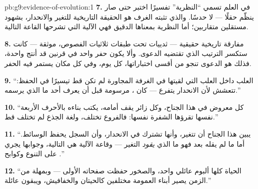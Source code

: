 \begin{solution}{pb:g9:evidence-of-evolution:1}
\textbf{7.} في العلم تسمي ``النظرية'' تفسيرًا اختبر حتى
صار ينظّم حقلًا --- لا حدسًا. والذي تثبته الغرف هو
الحقيقة التاريخية للتغير والانحدار، بشهود مستقلين
متقاربين؛ أما النظرية بمعناها الدقيق فهي الآلية التي
تشرحها القاعة التالية.

\textbf{8.} مفارقة تاريخية حقيقية ---  ثدييات تحت
طبقات ثلاثيات الفصوص، موثقة --- كانت ستكسر الترتيب الذي
تقتضيه الدعوى. وألا يكون حفر واحد في قرنين قد أنتج
واحدة، فذلك هو الدعوى تنجو من أقسى اختباراتها، كل يوم،
وفي كل مكان يستمر فيه الحفر.

\textbf{9.} ``العلب داخل العلب التي لقيتها في الغرفة
المجاورة لم تكن قط تيسيرًا في الحفظ:  تتعشش لأن
الانحدار يتفرع ---  كان ، مرسومة
قبل أن يعرف أحد ما الذي يرسمه.''

\textbf{10.} ``كل معروض في هذا الجناح، وكل زائر يقف
أمامه، يكتب بناءه بالأحرف الأربعة نفسها تقرؤها الشفرة
نفسها: فالفروع تختلف، ولغة الجذع لم تختلف قط.''

\textbf{11.} ``يبين هذا الجناح أن  تتغير، وأنها
تشترك في الانحدار، وأن السجل يحفظ الوسائط. أما ما لم
يقله بعد فهو ما الذي \emph{يقود} التغير --- وقاعة
الآلية هي التالية، وجوابها يجري على التنوع 
وكوابح .''

\textbf{12.} ``الحياة كلها ألبوم عائلي واحد، والصخور
حفظت صفحاته الأولى --- وبمهلة من الزمن يصير أبناء
العمومة مختلفين كالحيتان والخفافيش، ويبقون عائلة.''
\end{solution}
